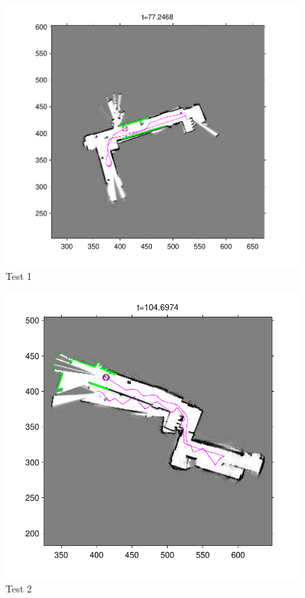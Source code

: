 \documentclass[twoside]{article}
\begin{document}
\begin{multicols}{2}
\begin{figure}[H]
\centering
\includegraphics[width=\columnwidth]{fig/test1.pdf}
\caption{Test 1}
\label{fig:test1}
\end{figure}

\begin{figure}[H]
\centering
\includegraphics[width=\columnwidth]{fig/test2.pdf}
\caption{Test 2}
\label{fig:test2}
\end{figure}


\end{multicols}
\end{document}
